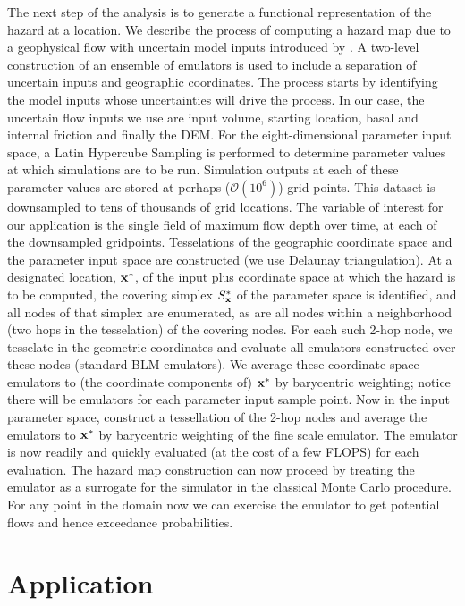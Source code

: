 \documentclass[a4paper,fleqn]{article}
\begin{document}
The next step of the analysis is to generate a functional
representation of the hazard at a location.  We describe the process
of computing a hazard map due to a geophysical flow with uncertain
model inputs introduced by \citet{dableyetalemulator,dalbeythesis}. A two-level construction of an
ensemble of emulators is used to include a separation of uncertain
inputs and geographic coordinates. The process starts by identifying
the model inputs whose uncertainties will drive the process. In our
case, the uncertain flow inputs we use are input volume, starting
location, basal and internal friction and finally the DEM.  For the
eight-dimensional parameter input space, a Latin Hypercube Sampling is
performed to determine parameter values at which simulations are to be
run. Simulation outputs at each of these parameter values are stored
at perhaps ($\mathcal {O} (10^6)$) grid points. This dataset is
downsampled to tens of thousands of grid locations.  The variable of
interest for our application is the single field of maximum flow depth
over time, at each of the downsampled gridpoints.  Tesselations of the
geographic coordinate space and the parameter input space are
constructed (we use Delaunay triangulation).  At a designated
location, ${\bf x}^*$, of the input plus coordinate space at which the
hazard is to be computed, the covering simplex $S_{\bf x}^* $ of the
parameter space is identified, and all nodes of that simplex are
enumerated, as are all nodes within a neighborhood (two hops in the
tesselation) of the covering nodes.  For each such 2-hop node, we
tesselate in the geometric coordinates and evaluate all emulators
constructed over these nodes (standard BLM emulators).  We average
these coordinate space emulators to (the coordinate components of)
${\bf x}^*$ by barycentric weighting; notice there will be emulators
for each parameter input sample point. Now in the input parameter
space, construct a tessellation of the 2-hop nodes and average the
emulators to ${\bf x}^*$ by barycentric weighting of the fine scale
emulator.  The emulator is now readily and quickly evaluated (at the
cost of a few FLOPS) for each evaluation. The hazard map construction
can now proceed by treating the emulator as a surrogate for the
simulator in the classical Monte Carlo procedure. For any point in the
domain now we can exercise the emulator to get potential flows and
hence exceedance probabilities.

\section{Application}
\end{document}
